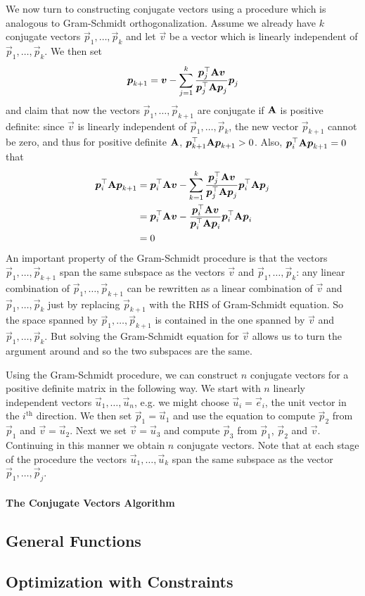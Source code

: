 We now turn to constructing conjugate vectors using a procedure which is analogous to Gram-Schmidt orthogonalization. Assume we already have $k$ conjugate vectors $\vec{p}_1,\dotsc,\vec{p}_k$ and let $\vec{v}$ be a vector which is linearly independent of $\vec{p}_1,\dotsc,\vec{p}_k$. We then set
\begin{align*}
	\boldsymbol{p}_{k+1}=\boldsymbol{v}-\sum_{j=1}^k\frac{\boldsymbol{p}_j^\top\mathbf{A}\boldsymbol{v}}{\boldsymbol{p}_j^\top\mathbf{A}\boldsymbol{p}_j}\boldsymbol{p}_j
\end{align*}
and claim that now the vectors $\vec{p}_1,\dotsc,\vec{p}_{k+1}$ are conjugate if $\mathbf{A}$ is positive definite: since $\vec{v}$ is linearly independent of $\vec{p}_1,\dotsc,\vec{p}_k$, the new vector $\vec{p}_{k+1}$ cannot be zero, and thus for positive definite $\mathbf{A}$, $\boldsymbol{p}_{k+1}^\top\mathbf{A}\boldsymbol{p}_{k+1}>0$. Also, $\boldsymbol{p}_i^\top\mathbf{A}\boldsymbol{p}_{k+1}=0$ that
\begin{align*}
	\boldsymbol{p}_i^\top\mathbf{A}\boldsymbol{p}_{k+1}&=\boldsymbol{p}_i^\top\mathbf{A}\boldsymbol{v}-\sum_{k=1}^k\frac{\boldsymbol{p}_j^\top\mathbf{A}\boldsymbol{v}}{\boldsymbol{p}_j^\top\mathbf{A}\boldsymbol{p}_j}\boldsymbol{p}_i^\top\mathbf{A}\boldsymbol{p}_j \\
	&=\boldsymbol{p}_i^\top\mathbf{A}\boldsymbol{v}-\frac{\boldsymbol{p}_i^\top\mathbf{A}\boldsymbol{v}}{\boldsymbol{p}_i^\top\mathbf{A}\boldsymbol{p}_i}\boldsymbol{p}_i^\top\mathbf{A}\boldsymbol{p}_i \\
	&=0
\end{align*}
An important property of the Gram-Schmidt procedure is that the vectors $\vec{p}_1,\dotsc,\vec{p}_{k+1}$ span the same subspace as the vectors $\vec{v}$ and $\vec{p}_1,\dotsc,\vec{p}_k$: any linear combination of $\vec{p}_1,\dotsc,\vec{p}_{k+1}$ can be rewritten as a linear combination of $\vec{v}$ and $\vec{p}_1,\dotsc,\vec{p}_k$ just by replacing $\vec{p}_{k+1}$ with the RHS of Gram-Schmidt equation. So the space spanned by $\vec{p}_1,\dotsc,\vec{p}_{k+1}$ is contained in the one spanned by $\vec{v}$ and $\vec{p}_1,\dotsc,\vec{p}_k$. But solving the Gram-Schmidt equation for $\vec{v}$ allows us to turn the argument around and so the two subspaces are the same.

Using the Gram-Schmidt procedure, we can construct $n$ conjugate vectors for a positive definite matrix in the following way. We start with $n$ linearly independent vectors $\vec{u}_1,\dotsc,\vec{u}_n$, e.g. we might choose $\vec{u}_i=\vec{e}_i$, the unit vector in the $i^\text{th}$ direction. We then set $\vec{p}_1=\vec{u}_1$ and use the equation to compute $\vec{p}_2$ from $\vec{p}_1$ and $\vec{v}=\vec{u}_2$. Next we set $\vec{v}=\vec{u}_3$ and compute $\vec{p}_3$ from $\vec{p}_1$, $\vec{p}_2$ and $\vec{v}$. Continuing in this manner we obtain $n$ conjugate vectors. Note that at each stage of the procedure the vectors $\vec{u}_1,\dotsc,\vec{u}_k$ span the same subspace as the vector $\vec{p}_1,\dotsc,\vec{p}_j$.

\paragraph{The Conjugate Vectors Algorithm}



\subsection{General Functions}

\subsection{Optimization with Constraints}